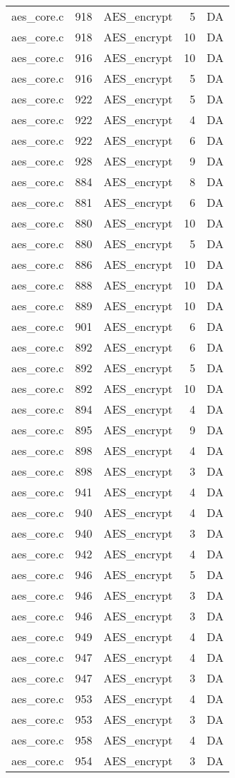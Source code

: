 \begin{table}
\begin{tabular}{clrrr}
aes\_core.c& 918&AES\_encrypt&5 &DA\\
aes\_core.c& 918&AES\_encrypt&10&DA\\
aes\_core.c& 916&AES\_encrypt&10&DA\\
aes\_core.c& 916&AES\_encrypt&5 &DA\\
aes\_core.c& 922&AES\_encrypt&5 &DA\\
aes\_core.c& 922&AES\_encrypt&4 &DA\\
aes\_core.c& 922&AES\_encrypt&6 &DA\\
aes\_core.c& 928&AES\_encrypt&9 &DA\\
aes\_core.c& 884&AES\_encrypt&8 &DA\\
aes\_core.c& 881&AES\_encrypt&6 &DA\\
aes\_core.c& 880&AES\_encrypt&10&DA\\
aes\_core.c& 880&AES\_encrypt&5 &DA\\
aes\_core.c& 886&AES\_encrypt&10&DA\\
aes\_core.c& 888&AES\_encrypt&10&DA\\
aes\_core.c& 889&AES\_encrypt&10&DA\\
aes\_core.c& 901&AES\_encrypt&6 &DA\\
aes\_core.c& 892&AES\_encrypt&6 &DA\\
aes\_core.c& 892&AES\_encrypt&5 &DA\\
aes\_core.c& 892&AES\_encrypt&10&DA\\
aes\_core.c& 894&AES\_encrypt&4 &DA\\
aes\_core.c& 895&AES\_encrypt&9 &DA\\
aes\_core.c& 898&AES\_encrypt&4 &DA\\
aes\_core.c& 898&AES\_encrypt&3 &DA\\
aes\_core.c& 941&AES\_encrypt&4 &DA\\
aes\_core.c& 940&AES\_encrypt&4 &DA\\
aes\_core.c& 940&AES\_encrypt&3 &DA\\
aes\_core.c& 942&AES\_encrypt&4 &DA\\
aes\_core.c& 946&AES\_encrypt&5 &DA\\
aes\_core.c& 946&AES\_encrypt&3 &DA\\
aes\_core.c& 946&AES\_encrypt&3 &DA\\
aes\_core.c& 949&AES\_encrypt&4 &DA\\
aes\_core.c& 947&AES\_encrypt&4 &DA\\
aes\_core.c& 947&AES\_encrypt&3 &DA\\
aes\_core.c& 953&AES\_encrypt&4 &DA\\
aes\_core.c& 953&AES\_encrypt&3 &DA\\
aes\_core.c& 958&AES\_encrypt&4 &DA\\
aes\_core.c& 954&AES\_encrypt&3 &DA\\
\hline
\end{tabular}
\end{table}
